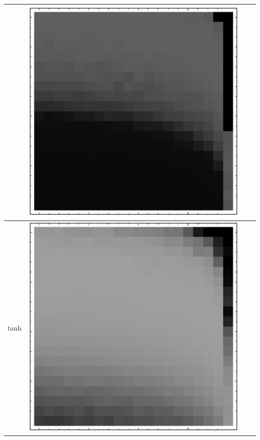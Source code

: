 \documentclass[10pt]{article}
\begin{document}
\begin{tabular}{|c|c|c|c|}
        & \includegraphics[scale=0.25]{plots/simple/LF-40S20S10S-20T10-MNIST-6.eps} \\ \hline
tanh
        & \includegraphics[scale=0.25]{plots/simple/LF-20T10T-20T10-MNIST-6.eps}

\end{tabular}
\end{document}
